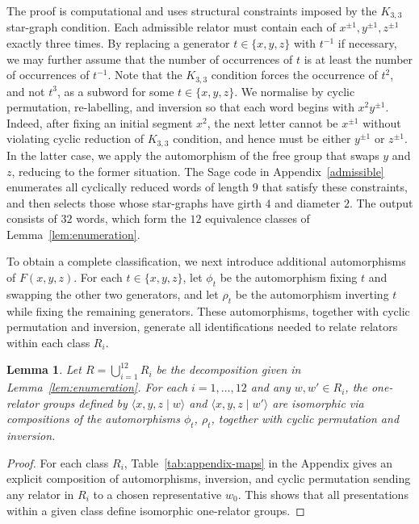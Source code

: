 \documentclass[a4paper,12pt,oneside]{article}
\newtheorem{lem}[theorem]{Lemma}
\begin{document}
The proof is computational and uses structural constraints imposed by the $K_{3,3}$ star-graph condition. Each admissible relator must contain each of $x^{\pm1}, y^{\pm1}, z^{\pm1}$ exactly three times. By replacing a generator $t \in \{x,y,z\}$ with $t^{-1}$ if necessary, we may further assume that the number of occurrences of $t$ is at least the number of occurrences of $t^{-1}$. Note that the $K_{3,3}$ condition forces the occurrence of $t^2$, and not $t^3$, as a subword for some $t \in \{x,y,z\}$. We normalise by cyclic permutation, re-labelling, and inversion so that each word begins with $x^2 y^{\pm 1}$. Indeed, after fixing an initial segment $x^2$, the next letter cannot be $x^{\pm1}$ without violating cyclic reduction of $K_{3,3}$ condition, and hence must be either $y^{\pm1}$ or $z^{\pm1}$. In the latter case, we apply the automorphism of the free group that swaps $y$ and $z$, reducing to the former situation. The Sage code in Appendix~\ref{admissible} enumerates all cyclically reduced words of length $9$ that satisfy these constraints, and then selects those whose star-graphs have girth $4$ and diameter $2$. The output consists of $32$ words, which form the $12$ equivalence classes of Lemma~\ref{lem:enumeration}.

\medskip
To obtain a complete classification, we next introduce additional automorphisms of $F(x,y,z)$. For each $t \in \{x,y,z\}$, let $\phi_t$ be the automorphism fixing $t$ and swapping the other two generators, and let $\rho_t$ be the automorphism inverting $t$ while fixing the remaining generators. These automorphisms, together with cyclic permutation and inversion, generate all identifications needed to relate relators within each class $R_i$.

\begin{lem}\label{lem:ri-isomorphism}
Let $R = \bigcup_{i=1}^{12} R_i$ be the decomposition given in Lemma~\ref{lem:enumeration}. 
For each $i = 1, \dots, 12$ and any $w, w' \in R_i$, the one-relator groups defined by
\(
\langle x, y, z \mid w \rangle\) and  
\(\langle x, y, z \mid w' \rangle
\)
are isomorphic via compositions of the automorphisms $\phi_t$, $\rho_t$, together with cyclic permutation and inversion.
\end{lem}

\begin{proof}
For each class $R_i$, Table~\ref{tab:appendix-maps} in the Appendix gives an explicit composition of automorphisms, inversion, and cyclic permutation sending any relator in $R_i$ to a chosen representative $w_0$. This shows that all presentations within a given class define isomorphic one-relator groups.
\end{proof}
\end{document}
